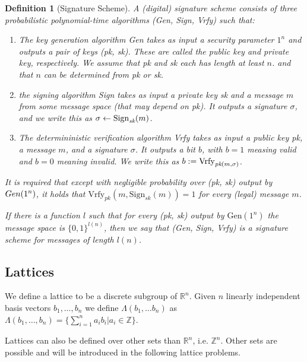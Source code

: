 \documentclass[a4paper,titlepage]{article}
\newtheorem{definition}{Definition}
\begin{document}
\begin{definition}[Signature Scheme]
A \textnormal{(digital) signature scheme} consists of three probabilistic polynomial-time algorithms \textnormal{(Gen, Sign, Vrfy)} such that:
\begin{enumerate}
    \item The \textnormal{key generation algorithm Gen} takes as input a security parameter $1^n$ and outputs a pair of keys (pk, sk). These are called the \textnormal{public key} and \textnormal{private key}, respectively. We assume that pk and sk each has length at least $n$. and that $n$ can be determined from pk or sk.
    
    \item the \textnormal{signing algorithm Sign} takes as input a private key sk and a message $m$ from some message space (that may depend on pk). It outputs a signature $\sigma$, and we write this as $\sigma \leftarrow \textnormal{Sign}_{\textit{sk}}(m)$. 
    
    \item The determininistic \textnormal{verification algorithm Vrfy} takes as input a public key pk, a message $m$, and a signature $\sigma$. It outputs a bit $b$, with $b = 1$ measing \textnormal{valid} and $b = 0$ meaning \textnormal{invalid}. We write this as $b := \textnormal{Vrfy}_{\textit{pk}(m, \sigma)}$.
\end{enumerate}
It is required that except with negligible probability over (pk, sk) output by $\textnormal{}{Gen}(1^n)$, it holds that $\text{Vrfy}_{\textit{pk}}(m, \text{Sign}_{\textit{sk}}(m)) = 1$ for every (legal) message $m$.

If there is a function $l$ such that for every (pk, sk) output by $\text{Gen}(1^n)$ the message space is $\{0,1\}^{l(n)}$, then we say that \textnormal{(Gen, Sign, Vrfy)} is a \textnormal{signature scheme for messages of length $l(n)$}.
\end{definition}





\subsection{Lattices}
We define a lattice to be a discrete subgroup of $\mathds{R}^n$. Given $n$ linearly independent basis vectors $b_1, \ldots, b_n$ we define $\Lambda(b_1, \ldots b_n)$ as $\Lambda(b_1, \ldots, b_n) = \{\sum_{i = 1}^n a_i b_i \vert a_i \in \mathds{Z}\}$.

Lattices can also be defined over other sets than $\mathds{R}^n$, i.e. $ \mathds{Z}^n$. Other sets are possible and will be introduced in the following lattice problems.
\end{document}
